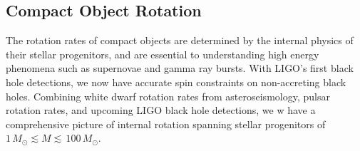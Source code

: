 {\color{orange}

\subsection{Compact Object Rotation}

The rotation rates of compact objects are determined by the internal physics of their stellar progenitors, and are essential to understanding high energy phenomena such as supernovae and gamma ray bursts. With LIGO's first black hole detections, we now have accurate spin constraints on non-accreting black holes. Combining white dwarf rotation rates from asteroseismology, pulsar rotation rates, and upcoming LIGO black hole detections, we w have a comprehensive picture of internal rotation spanning stellar progenitors of $1 \, M_\odot \lesssim M \lesssim \, 100 \, M_\odot$.

}